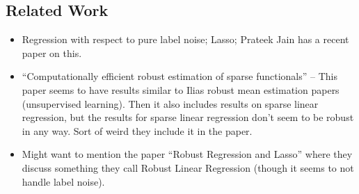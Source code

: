 \subsection{Related Work}

\begin{itemize}

\item Regression with respect to pure label noise; Lasso; Prateek Jain
  has a recent paper on this. 

\item ``Computationally efficient robust estimation of sparse
  functionals'' -- This paper seems to have results similar to Ilias
  robust mean estimation papers (unsupervised learning).  Then it also
  includes results on sparse linear regression, but the results for
  sparse linear regression don't seem to be robust in any way. Sort of
  weird they include it in the paper.

\item Might want to mention the paper ``Robust Regression and Lasso''
  where they discuss something they call Robust Linear Regression
  (though it seems to not handle label noise). 

\end{itemize}

